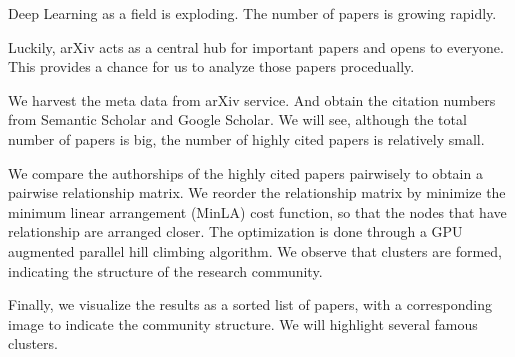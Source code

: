 
Deep Learning as a field is exploding.
The number of papers is growing rapidly.

Luckily, arXiv acts as a central hub for important papers and opens to everyone.
This provides a chance for us to analyze those papers procedually.

We harvest the meta data from arXiv service.
And obtain the citation numbers from Semantic Scholar and Google Scholar.
We will see, although the total number of papers is big, the number of highly cited papers is relatively small.

We compare the authorships of the highly cited papers pairwisely to obtain a pairwise relationship matrix.
We reorder the relationship matrix by minimize the minimum linear arrangement (MinLA) cost function, so that the nodes that have relationship are arranged closer.
The optimization is done through a GPU augmented parallel hill climbing algorithm.
We observe that clusters are formed, indicating the structure of the research community.

Finally, we visualize the results as a sorted list of papers, with a corresponding image to indicate the community structure.
We will highlight several famous clusters.

